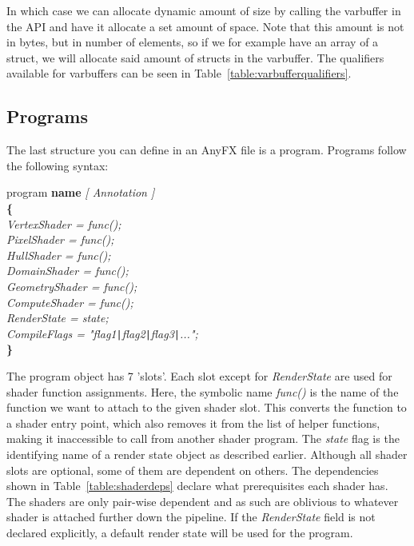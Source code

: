 \documentclass{article}
\newcommand{\SyntaxBox}[1]
{	
	\begin{center}
	\colorbox{orange!60}
	{
		\begin{minipage}{\linewidth}
		\hfill
		\begin{tabbing}
		#1
		\end{tabbing}
		\end{minipage}
	}
	\end{center}
}
\begin{document}
In which case we can allocate dynamic amount of size by calling the varbuffer in the API and have it allocate a set amount of space. Note that this amount is not in bytes, but in number of elements, so if we for example have an array of a struct, we will allocate said amount of structs in the varbuffer. The qualifiers available for varbuffers can be seen in Table~\ref{table:varbufferqualifiers}.

\begin{table}[hp]
\centering
\caption{Varbuffer qualifiers}
\label{table:varbufferqualifiers}
\end{table}

\subsection{Programs}
The last structure you can define in an AnyFX file is a program. Programs follow the following syntax:

\SyntaxBox
{
	program \textbf{name} \textit{ [ Annotation ] } \\
	\textbf{\{} \= \\
	\>	\textit{VertexShader = func();} \\
	\>	\textit{PixelShader = func();} \\ 
	\>	\textit{HullShader = func();} \\ 
	\>	\textit{DomainShader = func();} \\ 
	\>	\textit{GeometryShader = func();} \\
	\>	\textit{ComputeShader = func();} \\
	\>	\textit{RenderState = state;} \\
	\>	\textit{CompileFlags = "flag1\texttt{|}flag2\texttt{|}flag3\texttt{|}...";} \\
	\textbf{\}}
}

The program object has 7 'slots'. Each slot except for \textit{RenderState} are used for shader function assignments. Here, the symbolic name \textit{func()} is the name of the function we want to attach to the given shader slot. This converts the function to a shader entry point, which also removes it from the list of helper functions, making it inaccessible to call from another shader program. The \textit{state} flag is the identifying name of a render state object as described earlier. Although all shader slots are optional, some of them are dependent on others. The dependencies shown in Table~\ref{table:shaderdeps} declare what prerequisites each shader has. The shaders are only pair-wise dependent and as such are oblivious to whatever shader is attached further down the pipeline. If the \textit{RenderState} field is not declared explicitly, a default render state will be used for the program.
\end{document}
